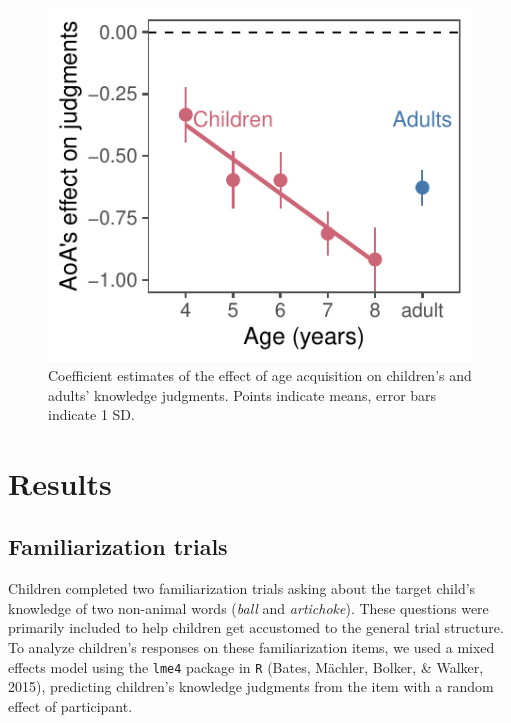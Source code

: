 \documentclass[10pt, letterpaper]{article}
\newenvironment{CodeChunk}{}{}
\begin{document}
\begin{CodeChunk}
\begin{figure}[tb]
\includegraphics{figs/age_terms-1} \caption[Coefficient estimates of the effect of age acquisition on children's and adults' knowledge judgments]{Coefficient estimates of the effect of age acquisition on children's and adults' knowledge judgments. Points indicate means, error bars indicate 1 SD.}\label{fig:age_terms}
\end{figure}
\end{CodeChunk}

\hypertarget{results}{%
\section{Results}\label{results}}

\hypertarget{familiarization-trials}{%
\subsection{Familiarization trials}\label{familiarization-trials}}

Children completed two familiarization trials asking about the target
child's knowledge of two non-animal words (\emph{ball} and
\emph{artichoke}). These questions were primarily included to help
children get accustomed to the general trial structure. To analyze
children's responses on these familiarization items, we used a mixed
effects model using the \texttt{lme4} package in \texttt{R} (Bates,
Mächler, Bolker, \& Walker, 2015), predicting children's knowledge
judgments from the item with a random effect of participant.
\end{document}

